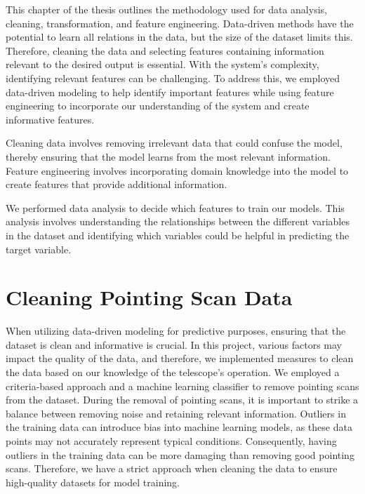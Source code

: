 
This chapter of the thesis outlines the methodology used for data analysis, cleaning, transformation, and feature engineering.
Data-driven methods have the potential to learn all relations in the data, but the size of the dataset limits this.
Therefore, cleaning the data and selecting features containing information relevant to the desired output is essential.
With the system's complexity, identifying relevant features can be challenging.
To address this, we employed data-driven modeling to help identify important features while using feature engineering to incorporate
our understanding of the system and create informative features.

Cleaning data involves removing irrelevant data that could confuse the model, thereby ensuring that the model learns from the most relevant information.
Feature engineering involves incorporating domain knowledge into the model to create features that provide additional information.

We performed data analysis to decide which features to train our models.
This analysis involves understanding the relationships between the different variables in the dataset and identifying which variables
could be helpful in predicting the target variable.


\section{Cleaning Pointing Scan Data} \label{sec:cleaning_pt_scan}

When utilizing data-driven modeling for predictive purposes, ensuring that the dataset is clean and informative is crucial.
In this project, various factors may impact the quality of the data, and therefore, we implemented measures to clean the data based on our knowledge of the telescope's operation.
We employed a criteria-based approach and a machine learning classifier to remove pointing scans from the dataset.
During the removal of pointing scans, it is important to strike a balance between removing noise and retaining relevant information.
Outliers in the training data can introduce bias into machine learning models, as these data points may not accurately represent typical conditions.
Consequently, having outliers in the training data can be more damaging than removing good pointing scans.
Therefore, we have a strict approach when cleaning the data to ensure high-quality datasets for model training.


